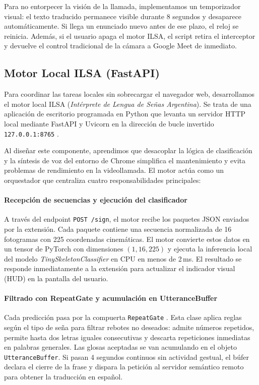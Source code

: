 Para no entorpecer la visión de la llamada, implementamos un temporizador visual: el texto traducido permanece visible durante 8 segundos y desaparece automáticamente. Si llega un enunciado nuevo antes de ese plazo, el reloj se reinicia. Además, si el usuario apaga el motor ILSA, el script retira el interceptor y devuelve el control tradicional de la cámara a Google Meet de inmediato.

\subsection{Motor Local ILSA (FastAPI)}

Para coordinar las tareas locales sin sobrecargar el navegador web, desarrollamos el motor local ILSA (\textit{Intérprete de Lengua de Señas Argentina}). Se trata de una aplicación de escritorio programada en Python que levanta un servidor HTTP local mediante FastAPI y Uvicorn en la dirección de bucle invertido \texttt{127.0.0.1:8765} \parencite{tiangolo2018fastapi}. 

Al diseñar este componente, aprendimos que desacoplar la lógica de clasificación y la síntesis de voz del entorno de Chrome simplifica el mantenimiento y evita problemas de rendimiento en la videollamada. El motor actúa como un orquestador que centraliza cuatro responsabilidades principales:

\paragraph{Recepción de secuencias y ejecución del clasificador}
A través del endpoint \texttt{POST /sign}, el motor recibe los paquetes JSON enviados por la extensión. Cada paquete contiene una secuencia normalizada de 16 fotogramas con 225 coordenadas cinemáticas. El motor convierte estos datos en un tensor de PyTorch con dimensiones $(1, 16, 225)$ y ejecuta la inferencia local del modelo \textit{TinySkeletonClassifier} en CPU en menos de 2\,ms. El resultado se responde inmediatamente a la extensión para actualizar el indicador visual (HUD) en la pantalla del usuario.

\paragraph{Filtrado con RepeatGate y acumulación en UtteranceBuffer}
Cada predicción pasa por la compuerta \texttt{RepeatGate} \parencite{gamma1994design}. Esta clase aplica reglas según el tipo de seña para filtrar rebotes no deseados: admite números repetidos, permite hasta dos letras iguales consecutivas y descarta repeticiones inmediatas en palabras generales. Las glosas aceptadas se van acumulando en el objeto \texttt{UtteranceBuffer}. Si pasan 4 segundos continuos sin actividad gestual, el búfer declara el cierre de la frase y dispara la petición al servidor semántico remoto para obtener la traducción en español.

